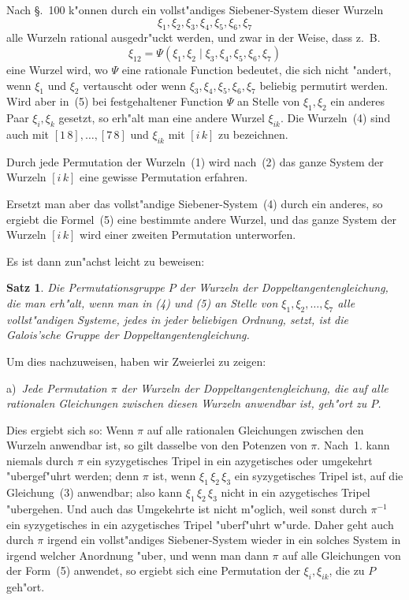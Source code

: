 \documentclass[12pt,a4paper]{article}
\theoremstyle{plain}
\newtheorem{satz}{Satz}[section]
\begin{document}
Nach \S.~100 k"onnen durch ein vollst"andiges Siebener-System dieser Wurzeln
\begin{equation}\tag{4}
\xi_1, \xi_2, \xi_3, \xi_4, \xi_5, \xi_6, \xi_7
\end{equation}
alle Wurzeln rational ausgedr"uckt werden, und zwar in der Weise, dass z.~B.
\begin{equation}\tag{5}
\xi_{12} = \Psi(\xi_1, \xi_2 \mid \xi_3, \xi_4, \xi_5, \xi_6, \xi_7)
\end{equation}
eine Wurzel wird, wo $\Psi$ eine rationale Function bedeutet, die sich nicht "andert, wenn $\xi_1$ und $\xi_2$ vertauscht oder wenn $\xi_3, \xi_4, \xi_5, \xi_6, \xi_7$ beliebig permutirt werden. Wird aber in~(5) bei festgehaltener Function $\Psi$ an Stelle von $\xi_1, \xi_2$ ein anderes Paar $\xi_i, \xi_k$ gesetzt, so erh"alt man eine andere Wurzel $\xi_{ik}$. Die Wurzeln~(4) sind auch mit $[1\,8],\ldots,[7\,8]$ und $\xi_{ik}$ mit $[i\,k]$ zu bezeichnen.

Durch jede Permutation der Wurzeln~(1) wird nach~(2) das ganze System der Wurzeln $[i\,k]$ eine gewisse Permutation erfahren.

Ersetzt man aber das vollst"andige Siebener-System~(4) durch ein anderes, so ergiebt die Formel~(5) eine bestimmte andere Wurzel, und das ganze System der Wurzeln $[i\,k]$ wird einer zweiten Permutation unterworfen.

Es ist dann zun"achst leicht zu beweisen:

\begin{satz}
Die Permutationsgruppe $P$ der Wurzeln der Doppeltangentengleichung, die man erh"alt, wenn man in (4) und (5) an Stelle von $\xi_1, \xi_2, \ldots, \xi_7$ alle vollst"andigen Systeme, jedes in jeder beliebigen Ordnung, setzt, ist die Galois'sche Gruppe der Doppeltangentengleichung.
\end{satz}

Um dies nachzuweisen, haben wir Zweierlei zu zeigen:

a)~\emph{Jede Permutation $\pi$ der Wurzeln der Doppeltangentengleichung, die auf alle rationalen Gleichungen zwischen diesen Wurzeln anwendbar ist, geh"ort zu $P$.}

Dies ergiebt sich so: Wenn $\pi$ auf alle rationalen Gleichungen zwischen den Wurzeln anwendbar ist, so gilt dasselbe von den Potenzen von $\pi$. Nach~1. kann niemals durch $\pi$ ein syzygetisches Tripel in ein azygetisches oder umgekehrt "ubergef"uhrt werden; denn $\pi$ ist, wenn $\xi_1\,\xi_2\,\xi_3$ ein syzygetisches Tripel ist, auf die Gleichung~(3) anwendbar; also kann $\xi_1\,\xi_2\,\xi_3$ nicht in ein azygetisches Tripel "ubergehen. Und auch das Umgekehrte ist nicht m"oglich, weil sonst durch $\pi^{-1}$ ein syzygetisches in ein azygetisches Tripel "uberf"uhrt w"urde. Daher geht auch durch $\pi$ irgend ein vollst"andiges Siebener-System wieder in ein solches System in irgend welcher Anordnung "uber, und wenn man dann $\pi$ auf alle Gleichungen von der Form~(5) anwendet, so ergiebt sich eine Permutation der $\xi_i, \xi_{ik}$, die zu $P$ geh"ort.
\end{document}

